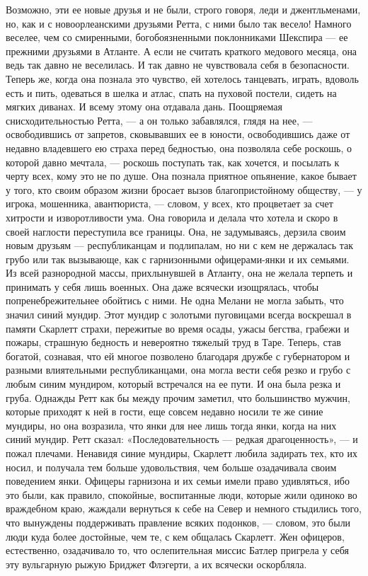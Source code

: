 Возможно, эти ее новые друзья и не были, строго говоря, леди и джентльменами, но, как и с новоорлеанскими друзьями Ретта, с ними было так весело! Намного веселее, чем со смиренными, богобоязненными поклонниками Шекспира — ее прежними друзьями в Атланте. А если не считать краткого медового месяца, она ведь так давно не веселилась. И так давно не чувствовала себя в безопасности. Теперь же, когда она познала это чувство, ей хотелось танцевать, играть, вдоволь есть и пить, одеваться в шелка и атлас, спать на пуховой постели, сидеть на мягких диванах. И всему этому она отдавала дань. Поощряемая снисходительностью Ретта, — а он только забавлялся, глядя на нее, — освободившись от запретов, сковывавших ее в юности, освободившись даже от недавно владевшего ею страха перед бедностью, она позволяла себе роскошь, о которой давно мечтала, — роскошь поступать так, как хочется, и посылать к черту всех, кому это не по душе.
Она познала приятное опьянение, какое бывает у того, кто своим образом жизни бросает вызов благопристойному обществу, — у игрока, мошенника, авантюриста, — словом, у всех, кто процветает за счет хитрости и изворотливости ума. Она говорила и делала что хотела и скоро в своей наглости переступила все границы.
Она, не задумываясь, дерзила своим новым друзьям — республиканцам и подлипалам, но ни с кем не держалась так грубо или так вызывающе, как с гарнизонными офицерами-янки и их семьями. Из всей разнородной массы, прихлынувшей в Атланту, она не желала терпеть и принимать у себя лишь военных. Она даже всячески изощрялась, чтобы попренебрежительнее обойтись с ними. Не одна Мелани не могла забыть, что значил синий мундир. Этот мундир с золотыми пуговицами всегда воскрешал в памяти Скарлетт страхи, пережитые во время осады, ужасы бегства, грабежи и пожары, страшную бедность и невероятно тяжелый труд в Таре. Теперь, став богатой, сознавая, что ей многое позволено благодаря дружбе с губернатором и разными влиятельными республиканцами, она могла вести себя резко и грубо с любым синим мундиром, который встречался на ее пути. И она была резка и груба.
Однажды Ретт как бы между прочим заметил, что большинство мужчин, которые приходят к ней в гости, еще совсем недавно носили те же синие мундиры, но она возразила, что янки для нее лишь тогда янки, когда на них синий мундир. Ретт сказал: «Последовательность — редкая драгоценность», — и пожал плечами.
Ненавидя синие мундиры, Скарлетт любила задирать тех, кто их носил, и получала тем больше удовольствия, чем больше озадачивала своим поведением янки. Офицеры гарнизона и их семьи имели право удивляться, ибо это были, как правило, спокойные, воспитанные люди, которые жили одиноко во враждебном краю, жаждали вернуться к себе на Север и немного стыдились того, что вынуждены поддерживать правление всяких подонков, — словом, это были люди куда более достойные, чем те, с кем общалась Скарлетт. Жен офицеров, естественно, озадачивало то, что ослепительная миссис Батлер пригрела у себя эту вульгарную рыжую Бриджет Флэгерти, а их всячески оскорбляла.
